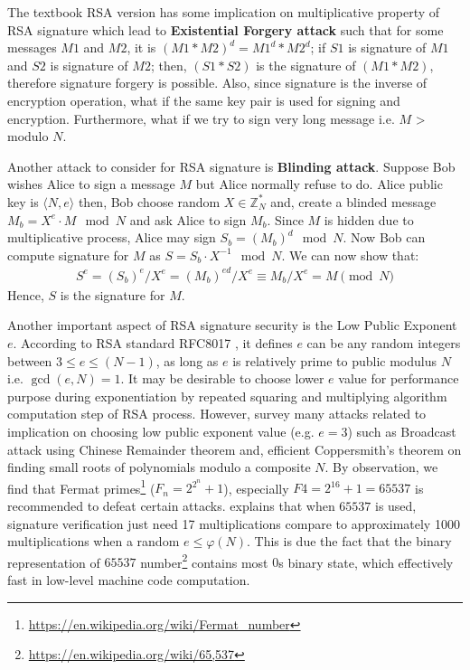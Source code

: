 \documentclass[10pt,sigconf]{acmart}
\newcommand{\Z}{\mathbb{Z}}
\begin{document}
The textbook RSA version has some implication on multiplicative property of RSA signature which lead to \textbf{Existential Forgery attack} such that for some messages $M1$ and $M2$, it is $(M1 * M2)^d = M1^d * M2^d$; if $S1$ is signature of $M1$ and $S2$ is signature of $M2$; then, $(S1 * S2)$ is the signature of $(M1 * M2)$, therefore signature forgery is possible. Also, since signature is the inverse of encryption operation, what if the same key pair is used for signing and encryption. Furthermore, what if we try to sign very long message i.e. $M$ > modulo $N$.

Another attack to consider for RSA signature is \textbf{Blinding attack}. Suppose Bob wishes Alice to sign a message $M$ but Alice normally refuse to do. Alice public key is $\langle N, e \rangle$ then, Bob choose random $X \in \Z_{N}^*$ and, create a blinded message $M_b = X^e \cdot M \mod N$ and ask Alice to sign $M_b$. Since $M$ is hidden due to multiplicative process, Alice may sign $S_b = (M_{b})^d \mod N$. Now Bob can compute signature for $M$ as $S = S_b \cdot X^{-1} \mod N$. We can now show that: 
\begin{align*}
    S^e = (S_{b})^e / X^{e} = (M_b)^{ed} / X^{e} \equiv M_b / X^{e} = M \pmod N
\end{align*}
Hence, $S$ is the signature for $M$.

Another important aspect of RSA signature security is the Low Public Exponent $e$. According to RSA standard RFC8017 \cite{rfc8017}, it defines $e$ can be any random integers between $3 \leq e \leq (N - 1)$, as long as $e$ is relatively prime to public modulus $N$ i.e. $\gcd(e, N) = 1$. It may be desirable to choose lower $e$ value for performance purpose during exponentiation by repeated squaring and multiplying algorithm computation step of RSA process. However, \cite{boneh1999twenty} survey many attacks related to implication on choosing low public exponent value (e.g. $e=3$) such as Broadcast attack using Chinese Remainder theorem and, efficient Coppersmith's \cite{coppersmith1997small} theorem on finding small roots of polynomials modulo a composite $N$. By observation, we find that Fermat primes\footnote{\url{https://en.wikipedia.org/wiki/Fermat\_number}} ($F_n = 2^{2^n} + 1$), especially $F4 = 2^{16}+ 1 = 65537$ is recommended to defeat certain attacks. \cite{boneh1999twenty} explains that when $65537$ is used, signature verification just need 17 multiplications compare to approximately 1000 multiplications when a random $e \leq \varphi(N)$. This is due the fact that the binary representation of $65537$ number\footnote{\url{https://en.wikipedia.org/wiki/65,537}} contains most $0$s binary state, which effectively fast in low-level machine code computation.
\end{document}
